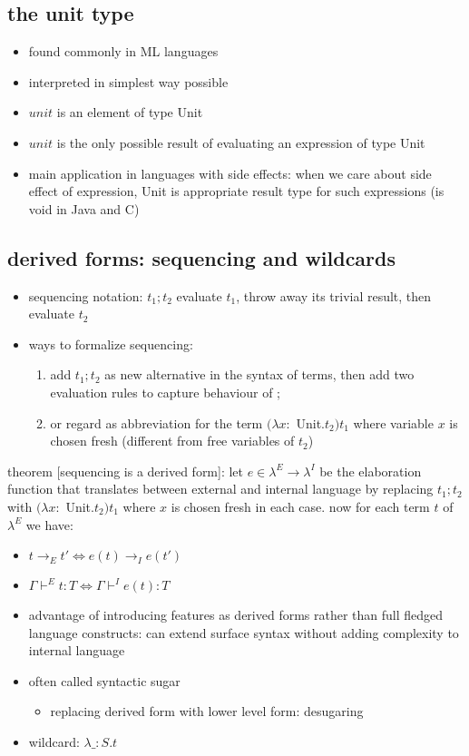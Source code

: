 \documentclass[11pt]{article}
\begin{document}
\subsection{the unit type}
\label{sec:org57ce461}
\begin{itemize}
\item found commonly in ML languages
\item interpreted in simplest way possible
\item \(unit\) is an element of type Unit
\item \(unit\) is the only possible result of evaluating an expression of type Unit
\item main application in languages with side effects: when we care about side effect of expression, Unit is appropriate result type for such expressions (is void in Java and C)
\end{itemize}

\subsection{derived forms: sequencing and wildcards}
\label{sec:org7ebd13a}
\begin{itemize}
\item sequencing notation: \(t_1;t_2\) evaluate \(t_1\), throw away its trivial result, then evaluate \(t_2\)
\item ways to formalize sequencing:
\begin{enumerate}
\item add \(t_1;t_2\) as new alternative in the syntax of terms, then add two evaluation rules to capture behaviour of ;
\item or regard as abbreviation for the term \((\lambda x :\) Unit.\(t_2) t_1\) where variable \(x\) is chosen fresh (different from free variables of \(t_2\))
\end{enumerate}
\end{itemize}

theorem [sequencing is a derived form]: let \(e \in \lambda^E \rightarrow \lambda^I\) be the elaboration function that translates between external and internal language by replacing \(t_1;t_2\) with \((\lambda x :\) Unit.\(t_2) t_1\) where \(x\) is chosen fresh in each case. now for each term \(t\) of \(\lambda^E\) we have:
\begin{itemize}
\item \(t \rightarrow_E t' \iff e(t) \rightarrow_I e(t')\)
\item \(\Gamma \vdash^E t:T \iff \Gamma \vdash^I e(t) : T\)

\item advantage of introducing features as derived forms rather than full fledged language constructs: can extend surface syntax without adding complexity to internal language
\item often called syntactic sugar
\begin{itemize}
\item replacing derived form with lower level form: desugaring
\end{itemize}
\item wildcard: \(\lambda\_:S.t\)
\end{itemize}
\end{document}

